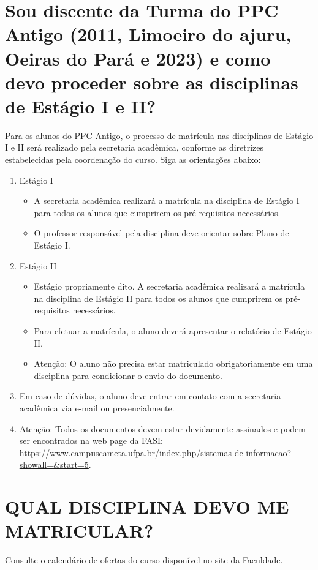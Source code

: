 \documentclass[12pt, a4paper]{article}
\begin{document}
\section{Sou discente da Turma do PPC Antigo (2011, Limoeiro do ajuru, Oeiras do Pará e 2023) e como devo proceder sobre as disciplinas de Estágio I e II?}
Para os alunos do PPC Antigo, o processo de matrícula nas disciplinas de Estágio I e II será realizado pela secretaria acadêmica, conforme as diretrizes estabelecidas pela coordenação do curso. Siga as orientações abaixo:
\begin{enumerate}
    \item Estágio I
    \begin{itemize}
        \item A secretaria acadêmica realizará a matrícula na disciplina de Estágio I para todos os alunos que cumprirem os pré-requisitos necessários.
        \item O professor responsável pela disciplina deve orientar sobre Plano de Estágio I.
    \end{itemize}
    \item Estágio II
    \begin{itemize}
        \item Estágio propriamente dito. A secretaria acadêmica realizará a matrícula na disciplina de Estágio II para todos os alunos que cumprirem os pré-requisitos necessários.
        \item Para efetuar a matrícula, o aluno deverá apresentar o relatório de Estágio II.
        \item Atenção: O aluno não precisa estar matriculado obrigatoriamente em uma disciplina para condicionar o envio do documento. 
    \end{itemize}   
    \item Em caso de dúvidas, o aluno deve entrar em contato com a secretaria acadêmica via e-mail ou presencialmente.
    \item Atenção: Todos os documentos devem estar devidamente assinados e podem ser encontrados na web page da FASI: \url{https://www.campuscameta.ufpa.br/index.php/sistemas-de-informacao?showall=&start=5}.
    
\end{enumerate}


\section{QUAL DISCIPLINA DEVO ME MATRICULAR?}
Consulte o calendário de ofertas do curso disponível no site da Faculdade.
\end{document}
